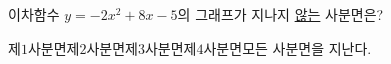 이차함수 $y=-2x^2+8x-5$의 그래프가 지나지 \underline{않는} 사분면은?
\begin{choices32}{제$1$사분면}{제$2$사분면}{제$3$사분면}{제$4$사분면}{모든 사분면을 지난다.}\end{choices32}
